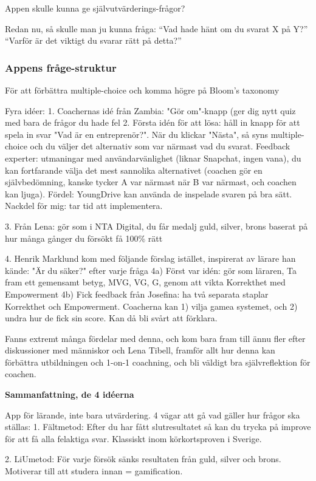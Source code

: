 Appen skulle kunna ge självutvärderings-frågor?

Redan nu, så skulle man ju kunna fråga: “Vad hade hänt om du svarat X på Y?”
“Varför är det viktigt du svarar rätt på detta?”

\subsubsection{Appens fråge-struktur}

För att förbättra multiple-choice och komma högre på Bloom's taxonomy

Fyra idéer:
1. Coachernas idé från Zambia: "Gör om"-knapp (ger dig nytt quiz med bara de frågor du hade fel
2. Första idén för att lösa: håll in knapp för att spela in svar "Vad är en entreprenör?". När du klickar "Nästa", så syns multiple-choice och du väljer det alternativ som var närmast vad du svarat. Feedback experter: utmaningar med användarvänlighet (liknar Snapchat, ingen vana), du kan fortfarande välja det mest sannolika alternativet (coachen gör en självbedömning, kanske tycker A var närmast när B var närmast, och coachen kan ljuga). Fördel: YoungDrive kan använda de inspelade svaren på bra sätt. Nackdel för mig: tar tid att implementera.

3. Från Lena: gör som i NTA Digital, du får medalj guld, silver, brons baserat på hur många gånger du försökt få 100\% rätt

4. Henrik Marklund kom med följande förslag istället, inspirerat av lärare han kände: "Är du säker?" efter varje fråga
4a) Först var idén: gör som läraren, Ta fram ett gemensamt betyg, MVG, VG, G, genom att vikta Korrekthet med Empowerment
4b) Fick feedback från Josefina: ha två separata staplar Korrekthet och Empowerment. Coacherna kan 1) vilja gamea systemet, och 2) undra hur de fick sin score. Kan då bli svårt att förklara.

Fanns extremt många fördelar med denna, och kom bara fram till ännu fler efter diskussioner med människor och Lena Tibell, framför allt hur denna kan förbättra utbildningen och 1-on-1 coachning, och bli väldigt bra självreflektion för coachen.

\textbf{Sammanfattning, de 4 idéerna}

App för lärande, inte bara utvärdering.
4 vägar att gå vad gäller hur frågor ska ställas:
1. Fältmetod: Efter du har fått slutresultatet så kan du trycka på improve för att få alla felaktiga svar. Klassiskt inom körkortsproven i Sverige.

2. LiUmetod: För varje försök sänks resultaten från guld, silver och brons. Motiverar till att studera innan = gamification.

